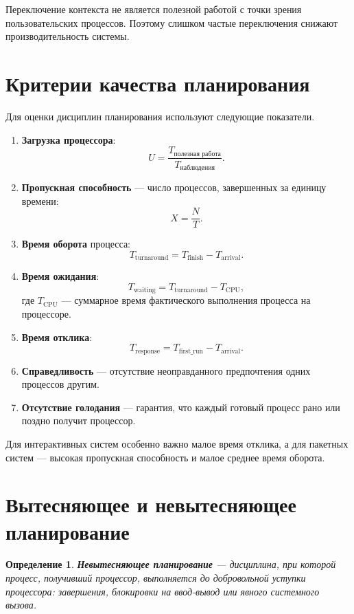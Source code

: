\documentclass[12pt,a4paper]{article}
\newtheorem{definition}{Определение}
\begin{document}
Переключение контекста не является полезной работой с точки зрения пользовательских процессов. Поэтому слишком частые переключения снижают производительность системы.

\section{Критерии качества планирования}

Для оценки дисциплин планирования используют следующие показатели.

\begin{enumerate}
    \item \textbf{Загрузка процессора}:
    \[
    U = \frac{T_{\text{полезная работа}}}{T_{\text{наблюдения}}}.
    \]

    \item \textbf{Пропускная способность} --- число процессов, завершенных за единицу времени:
    \[
    X = \frac{N}{T}.
    \]

    \item \textbf{Время оборота} процесса:
    \[
    T_{\text{turnaround}} = T_{\text{finish}} - T_{\text{arrival}}.
    \]

    \item \textbf{Время ожидания}:
    \[
    T_{\text{waiting}} = T_{\text{turnaround}} - T_{\text{CPU}},
    \]
    где $T_{\text{CPU}}$ --- суммарное время фактического выполнения процесса на процессоре.

    \item \textbf{Время отклика}:
    \[
    T_{\text{response}} = T_{\text{first\_run}} - T_{\text{arrival}}.
    \]

    \item \textbf{Справедливость} --- отсутствие неоправданного предпочтения одних процессов другим.

    \item \textbf{Отсутствие голодания} --- гарантия, что каждый готовый процесс рано или поздно получит процессор.
\end{enumerate}

Для интерактивных систем особенно важно малое время отклика, а для пакетных систем --- высокая пропускная способность и малое среднее время оборота.

\section{Вытесняющее и невытесняющее планирование}

\begin{definition}
\textbf{Невытесняющее планирование} --- дисциплина, при которой процесс, получивший процессор, выполняется до добровольной уступки процессора: завершения, блокировки на ввод-вывод или явного системного вызова.
\end{definition}
\end{document}
